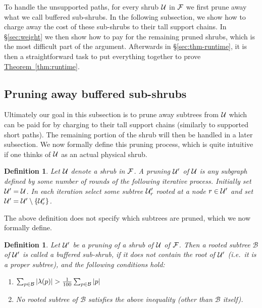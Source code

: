 \documentclass[11pt]{article}
\newtheorem{definition}[theorem]{Definition}
\theoremstyle{definition}
\newcommand{\cF}{{\cal F}}
\newcommand{\cU}{{\cal U}}
\newcommand{\Sec}[1]{\hyperref[sec:#1]{\S\ref*{sec:#1}}} %
\newcommand{\Thm}[1]{\hyperref[thm:#1]{Theorem~\ref*{thm:#1}}} %
\newcommand{\Lem}[1]{\hyperref[lem:#1]{Lemma~\ref*{lem:#1}}} %
\begin{document}
To handle the unsupported paths, for every shrub $\cU$ in $\cF$ we first prune away what we call buffered sub-shrubs.  In the following subsection, 
we show how to charge away the cost of these sub-shrubs to their tall support chains.  In \Sec{weight} we then show how to pay for the remaining pruned shrubs, 
which is the most difficult part of the argument.  Afterwards in \Sec{thm-runtime}, it is then a straightforward task to put everything together to prove \Thm{runtime}.


\newcommand{\buff}{\mathcal{B}}
\subsection{Pruning away buffered sub-shrubs}\label{sec:buffSub}
Ultimately our goal in this subsection is to prune away subtrees from $\cU$ which can be paid for by charging to their tall support chains (similarly to supported short paths). The remaining portion of the shrub will then be handled in a later subsection. We now formally define this pruning process, which is quite intuitive if one thinks of $\cU$ as an actual physical shrub.

\begin{definition}\label{def:prune}
  Let $\cU$ denote a shrub in $\cF$. A \emph{pruning} $\cU'$ of $\cU$ is any subgraph defined by some number of rounds of the following iterative process.  Initially set $\cU' = \cU$.  In each iteration select some subtree $\cU'_r$ rooted at a node $r\in \cU'$ and set $\cU' = \cU'\setminus \{\cU'_r\}$.  
\end{definition}

The above definition does not specify which subtrees are pruned, which we now formally define.

\begin{definition}\label{def:buff}
 Let $\cU'$ be a pruning of a shrub of $\cU$ of $\cF$. Then a rooted subtree $\buff$ of $\cU'$ is called a \emph{buffered sub-shrub}, if it does not contain the root of $\cU'$ (i.e.\ it is a proper subtree), and the following conditions hold:
  \begin{enumerate}
  \item $\sum_{p\in \buff} |\loss(p)| > \frac{1}{100} \sum_{p\in \buff} |p|$
  \item No rooted subtree of $\buff$ satisfies the above inequality (other than $\buff$ itself). 
 \end{enumerate}
\end{definition}
\end{document}
